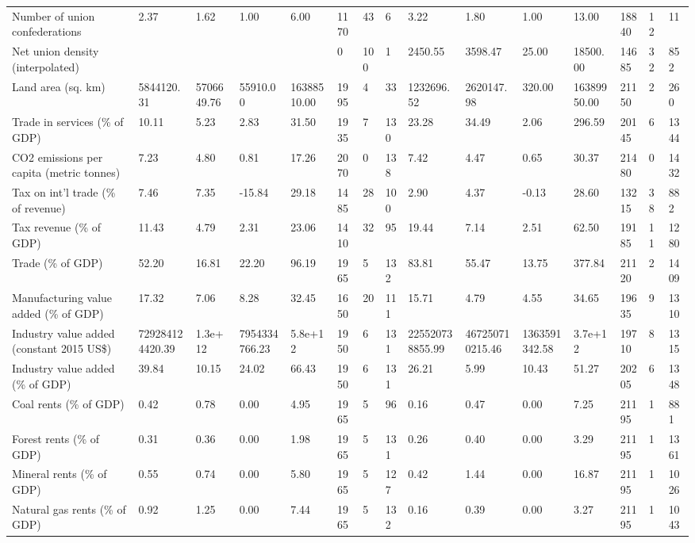 \begin{longtable}{lllllllllllllll}
Number of union confederations & 2.37 & 1.62 & 1.00 & 6.00 & 1170 & 43 & 6 & 3.22 & 1.80 & 1.00 & 13.00 & 18840 & 12 & 11\\
Net union density (interpolated) &  &  &  &  & 0 & 100 & 1 & 2450.55 & 3598.47 & 25.00 & 18500.00 & 14685 & 32 & 852\\
Land area (sq. km) & 5844120.31 & 5706649.76 & 55910.00 & 16388510.00 & 1995 & 4 & 33 & 1232696.52 & 2620147.98 & 320.00 & 16389950.00 & 21150 & 2 & 260\\
\addlinespace
Trade in services (\% of GDP) & 10.11 & 5.23 & 2.83 & 31.50 & 1935 & 7 & 130 & 23.28 & 34.49 & 2.06 & 296.59 & 20145 & 6 & 1344\\
CO2 emissions per capita (metric tonnes) & 7.23 & 4.80 & 0.81 & 17.26 & 2070 & 0 & 138 & 7.42 & 4.47 & 0.65 & 30.37 & 21480 & 0 & 1432\\
Tax on int'l trade (\% of revenue) & 7.46 & 7.35 & -15.84 & 29.18 & 1485 & 28 & 100 & 2.90 & 4.37 & -0.13 & 28.60 & 13215 & 38 & 882\\
Tax revenue (\% of GDP) & 11.43 & 4.79 & 2.31 & 23.06 & 1410 & 32 & 95 & 19.44 & 7.14 & 2.51 & 62.50 & 19185 & 11 & 1280\\
Trade (\% of GDP) & 52.20 & 16.81 & 22.20 & 96.19 & 1965 & 5 & 132 & 83.81 & 55.47 & 13.75 & 377.84 & 21120 & 2 & 1409\\
\addlinespace
Manufacturing value added (\% of GDP) & 17.32 & 7.06 & 8.28 & 32.45 & 1650 & 20 & 111 & 15.71 & 4.79 & 4.55 & 34.65 & 19635 & 9 & 1310\\
Industry value added (constant 2015 US\$) & 729284124420.39 & 1.3e+12 & 7954334766.23 & 5.8e+12 & 1950 & 6 & 131 & 225520738855.99 & 467250710215.46 & 1363591342.58 & 3.7e+12 & 19710 & 8 & 1315\\
Industry value added (\% of GDP) & 39.84 & 10.15 & 24.02 & 66.43 & 1950 & 6 & 131 & 26.21 & 5.99 & 10.43 & 51.27 & 20205 & 6 & 1348\\
Coal rents (\% of GDP) & 0.42 & 0.78 & 0.00 & 4.95 & 1965 & 5 & 96 & 0.16 & 0.47 & 0.00 & 7.25 & 21195 & 1 & 881\\
Forest rents (\% of GDP) & 0.31 & 0.36 & 0.00 & 1.98 & 1965 & 5 & 131 & 0.26 & 0.40 & 0.00 & 3.29 & 21195 & 1 & 1361\\
\addlinespace
Mineral rents (\% of GDP) & 0.55 & 0.74 & 0.00 & 5.80 & 1965 & 5 & 127 & 0.42 & 1.44 & 0.00 & 16.87 & 21195 & 1 & 1026\\
Natural gas rents (\% of GDP) & 0.92 & 1.25 & 0.00 & 7.44 & 1965 & 5 & 132 & 0.16 & 0.39 & 0.00 & 3.27 & 21195 & 1 & 1043\\

\end{longtable}
